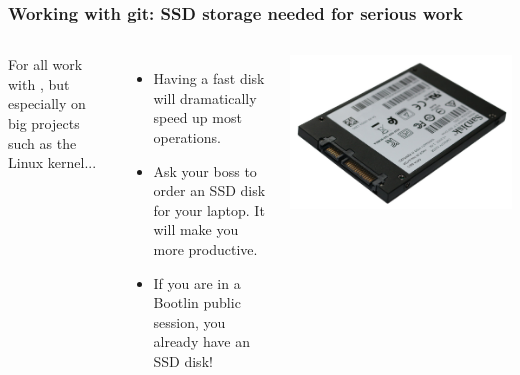 \begin{frame}
  \frametitle{Working with git: SSD storage needed for serious work}
  \begin{columns}
  For all work with , but especially on big projects such as
  the Linux kernel...
  \begin{itemize}
  \item Having a fast disk will dramatically speed up most 
    operations.
  \item Ask your boss to order an SSD disk for your laptop. It will make
    you more productive.
  \item If you are in a Bootlin public session, you already have an
    SSD disk!
  \end{itemize}
  \includegraphics[width=\textwidth]{slides/sysdev-linux-intro-sources/sandisk-ssd-back.jpg}
  \end{columns}
\end{frame}


